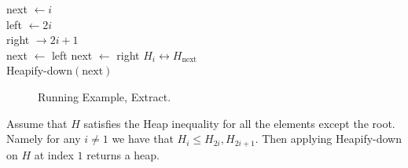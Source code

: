 \begin{algorithm}[H]
next  $\leftarrow i  $ \\
left  $\leftarrow 2i $ \\
right $\rightarrow 2i +1 $ \\ 
 {
  next $\leftarrow$ left 
}
 {
  next $\leftarrow$  right
}
 {
  $ H_{i} \leftrightarrow H_{\text{next}} $ \\ 
  Heapify-down$\left( \text{next}  \right)$
}
\end{algorithm}


\begin{figure}[h]
  \centering
  \begin{subfigure}[b]{0.23\textwidth}
	
  \end{subfigure}
\begin{subfigure}[b]{0.23\textwidth}
	
  \end{subfigure}
\begin{subfigure}[b]{0.23\textwidth}
	
  \end{subfigure}
\begin{subfigure}[b]{0.23\textwidth}
	
  \end{subfigure}
  \caption{Running Example, Extract.} 
\end{figure}


\begin{claim}
  
Assume that $H$ satisfies the Heap inequality for all the elements except the root. Namely for any $i \neq 1$ we have that $H_{i} \le H_{2i}, H_{2i+1}$. Then applying Heapify-down on $H$ at index $1$ returns a heap.  
\end{claim}

